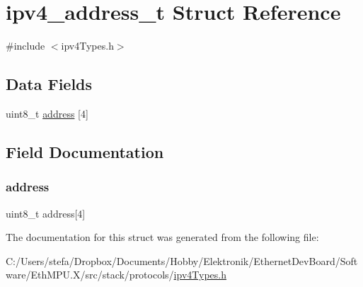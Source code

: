 \hypertarget{structipv4__address__t}{}\section{ipv4\+\_\+address\+\_\+t Struct Reference}
\label{structipv4__address__t}


{\ttfamily \#include $<$ipv4\+Types.\+h$>$}

\subsection*{Data Fields}
\begin{DoxyCompactItemize}
\item 
uint8\+\_\+t \mbox{\hyperlink{structipv4__address__t_addf23a7962e43c9ba2ed54c76bd937d3}{address}} \mbox{[}4\mbox{]}
\end{DoxyCompactItemize}


\subsection{Field Documentation}
\mbox{\label{structipv4__address__t_addf23a7962e43c9ba2ed54c76bd937d3}} 
\subsubsection{\texorpdfstring{address}{address}}
{\footnotesize\ttfamily uint8\+\_\+t address\mbox{[}4\mbox{]}}



The documentation for this struct was generated from the following file\+:\begin{DoxyCompactItemize}
\item 
C\+:/\+Users/stefa/\+Dropbox/\+Documents/\+Hobby/\+Elektronik/\+Ethernet\+Dev\+Board/\+Software/\+Eth\+M\+P\+U.\+X/src/stack/protocols/\mbox{\hyperlink{ipv4_types_8h}{ipv4\+Types.\+h}}\end{DoxyCompactItemize}
